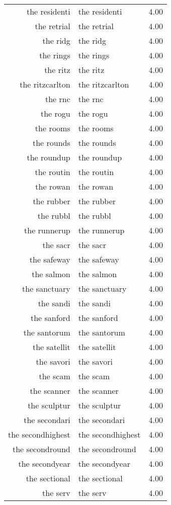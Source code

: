\begin{table}[ht]
\begin{tabular}{rlr}
  the residenti & the residenti & 4.00 \\ 
  the retrial & the retrial & 4.00 \\ 
  the ridg & the ridg & 4.00 \\ 
  the rings & the rings & 4.00 \\ 
  the ritz & the ritz & 4.00 \\ 
  the ritzcarlton & the ritzcarlton & 4.00 \\ 
  the rnc & the rnc & 4.00 \\ 
  the rogu & the rogu & 4.00 \\ 
  the rooms & the rooms & 4.00 \\ 
  the rounds & the rounds & 4.00 \\ 
  the roundup & the roundup & 4.00 \\ 
  the routin & the routin & 4.00 \\ 
  the rowan & the rowan & 4.00 \\ 
  the rubber & the rubber & 4.00 \\ 
  the rubbl & the rubbl & 4.00 \\ 
  the runnerup & the runnerup & 4.00 \\ 
  the sacr & the sacr & 4.00 \\ 
  the safeway & the safeway & 4.00 \\ 
  the salmon & the salmon & 4.00 \\ 
  the sanctuary & the sanctuary & 4.00 \\ 
  the sandi & the sandi & 4.00 \\ 
  the sanford & the sanford & 4.00 \\ 
  the santorum & the santorum & 4.00 \\ 
  the satellit & the satellit & 4.00 \\ 
  the savori & the savori & 4.00 \\ 
  the scam & the scam & 4.00 \\ 
  the scanner & the scanner & 4.00 \\ 
  the sculptur & the sculptur & 4.00 \\ 
  the secondari & the secondari & 4.00 \\ 
  the secondhighest & the secondhighest & 4.00 \\ 
  the secondround & the secondround & 4.00 \\ 
  the secondyear & the secondyear & 4.00 \\ 
  the sectional & the sectional & 4.00 \\ 
  the serv & the serv & 4.00 \\ 

\end{tabular}
\end{table}
